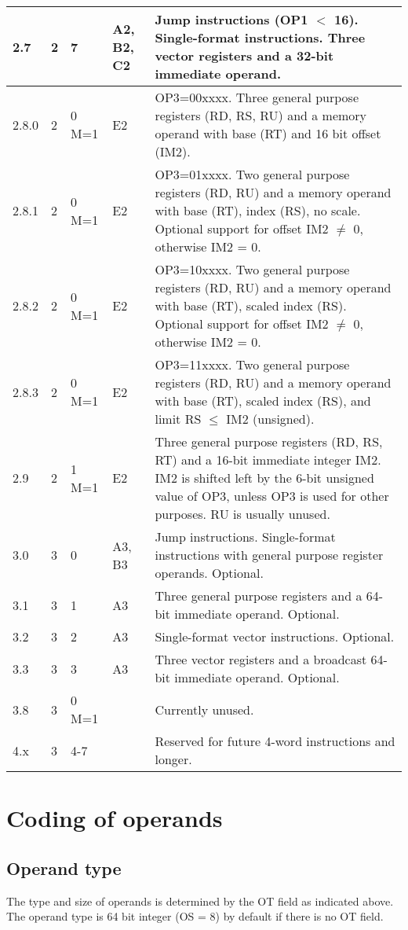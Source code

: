 \documentclass[forwardcom.tex]{subfiles}
\begin{document}
\begin{longtable} {|p{10mm}|p{7mm}|p{7mm}|p{7mm}|p{80mm}|}
\hline
2.7 & 2 & 7 & A2, B2, C2 & Jump instructions (OP1 $<$ 16). Single-format instructions. Three vector registers and a 32-bit immediate operand. \\
\hline
2.8.0 & 2 & 0 M=1 & E2 & OP3=00xxxx. Three general purpose registers (RD, RS, RU) and a memory operand with base (RT) and 16 bit offset (IM2).  \\
\hline
2.8.1 & 2 & 0 M=1 & E2 & OP3=01xxxx. Two general purpose registers (RD, RU) and a memory operand with base (RT), index (RS), no scale. Optional support for offset IM2 $\neq$ 0, otherwise IM2 = 0. \\
\hline
2.8.2 & 2 & 0 M=1 & E2 & OP3=10xxxx. Two general purpose registers (RD, RU) and a memory operand with base (RT), scaled index (RS). Optional support for offset IM2 $\neq$ 0, otherwise IM2 = 0. \\
\hline
2.8.3 & 2 & 0 M=1 & E2 & OP3=11xxxx. Two general purpose registers (RD, RU) and a memory operand with base (RT), scaled index (RS), and limit RS $\leq$ IM2 (unsigned). \\
\hline
2.9 & 2 & 1 M=1 & E2 & Three general purpose registers (RD, RS, RT) and a 16-bit immediate integer IM2. IM2 is shifted left by the 6-bit unsigned value of OP3, unless OP3 is used for other purposes. RU is usually unused. \\
\hline
3.0 & 3 & 0 & A3, B3 & Jump instructions. Single-format instructions with general purpose register operands. Optional. \\
\hline
3.1 & 3 & 1 & A3 & Three general purpose registers and a 64-bit immediate operand. Optional.  \\
\hline
3.2 & 3 & 2 & A3 & Single-format vector instructions. Optional. \\
\hline
3.3 & 3 & 3 & A3 & Three vector registers and a broadcast 64-bit immediate operand. Optional. \\
\hline
3.8 & 3 & 0 M=1 & & Currently unused. \\
\hline
4.x & 3 & 4-7 &  & Reserved for future 4-word instructions and longer. \\
\hline
\end{longtable}


\section{Coding of operands}
\subsection{Operand type}
The type and size of operands is determined by the OT field as indicated above. The operand type is 64 bit integer (OS = 8) by default if there is no OT field. 
\end{document}
